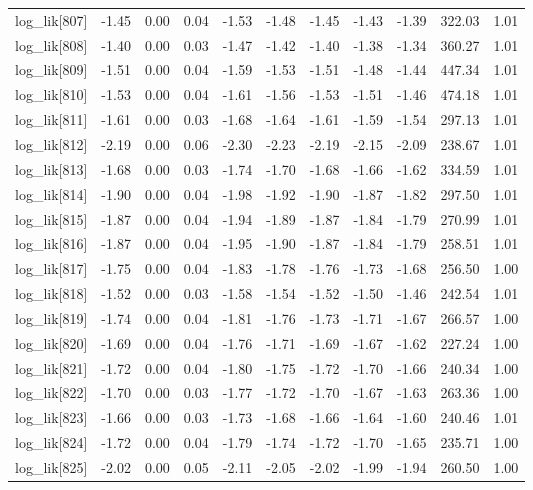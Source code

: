 \begin{table}[ht]
\begin{tabular}{rrrrrrrrrrr}
  log\_lik[807] & -1.45 & 0.00 & 0.04 & -1.53 & -1.48 & -1.45 & -1.43 & -1.39 & 322.03 & 1.01 \\ 
  log\_lik[808] & -1.40 & 0.00 & 0.03 & -1.47 & -1.42 & -1.40 & -1.38 & -1.34 & 360.27 & 1.01 \\ 
  log\_lik[809] & -1.51 & 0.00 & 0.04 & -1.59 & -1.53 & -1.51 & -1.48 & -1.44 & 447.34 & 1.01 \\ 
  log\_lik[810] & -1.53 & 0.00 & 0.04 & -1.61 & -1.56 & -1.53 & -1.51 & -1.46 & 474.18 & 1.01 \\ 
  log\_lik[811] & -1.61 & 0.00 & 0.03 & -1.68 & -1.64 & -1.61 & -1.59 & -1.54 & 297.13 & 1.01 \\ 
  log\_lik[812] & -2.19 & 0.00 & 0.06 & -2.30 & -2.23 & -2.19 & -2.15 & -2.09 & 238.67 & 1.01 \\ 
  log\_lik[813] & -1.68 & 0.00 & 0.03 & -1.74 & -1.70 & -1.68 & -1.66 & -1.62 & 334.59 & 1.01 \\ 
  log\_lik[814] & -1.90 & 0.00 & 0.04 & -1.98 & -1.92 & -1.90 & -1.87 & -1.82 & 297.50 & 1.01 \\ 
  log\_lik[815] & -1.87 & 0.00 & 0.04 & -1.94 & -1.89 & -1.87 & -1.84 & -1.79 & 270.99 & 1.01 \\ 
  log\_lik[816] & -1.87 & 0.00 & 0.04 & -1.95 & -1.90 & -1.87 & -1.84 & -1.79 & 258.51 & 1.01 \\ 
  log\_lik[817] & -1.75 & 0.00 & 0.04 & -1.83 & -1.78 & -1.76 & -1.73 & -1.68 & 256.50 & 1.00 \\ 
  log\_lik[818] & -1.52 & 0.00 & 0.03 & -1.58 & -1.54 & -1.52 & -1.50 & -1.46 & 242.54 & 1.01 \\ 
  log\_lik[819] & -1.74 & 0.00 & 0.04 & -1.81 & -1.76 & -1.73 & -1.71 & -1.67 & 266.57 & 1.00 \\ 
  log\_lik[820] & -1.69 & 0.00 & 0.04 & -1.76 & -1.71 & -1.69 & -1.67 & -1.62 & 227.24 & 1.00 \\ 
  log\_lik[821] & -1.72 & 0.00 & 0.04 & -1.80 & -1.75 & -1.72 & -1.70 & -1.66 & 240.34 & 1.00 \\ 
  log\_lik[822] & -1.70 & 0.00 & 0.03 & -1.77 & -1.72 & -1.70 & -1.67 & -1.63 & 263.36 & 1.00 \\ 
  log\_lik[823] & -1.66 & 0.00 & 0.03 & -1.73 & -1.68 & -1.66 & -1.64 & -1.60 & 240.46 & 1.01 \\ 
  log\_lik[824] & -1.72 & 0.00 & 0.04 & -1.79 & -1.74 & -1.72 & -1.70 & -1.65 & 235.71 & 1.00 \\ 
  log\_lik[825] & -2.02 & 0.00 & 0.05 & -2.11 & -2.05 & -2.02 & -1.99 & -1.94 & 260.50 & 1.00 \\ 

\end{tabular}
\end{table}
